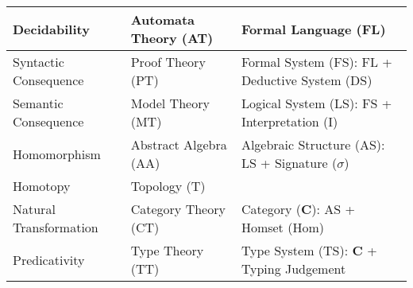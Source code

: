 \begin{tabularx}{\textwidth}{| X | X | X |}
    \hline
    Decidability            & Automata Theory (AT)  & Formal Language (FL) \\
    \hline
    Syntactic Consequence   & Proof Theory (PT)     & Formal System (FS): FL + Deductive System (DS) \\
    \hline
    Semantic Consequence    & Model Theory (MT)     & Logical System (LS): FS + Interpretation (I) \\
    \hline
    Homomorphism            & Abstract Algebra (AA) & Algebraic Structure (AS): LS + Signature ($\sigma$) \\
    \hline
    Homotopy                & Topology (T)          & \\
    \hline
    Natural Transformation  & Category Theory (CT)  & Category ($\mathbf{C}$): AS + Homset (Hom) \\
    \hline
    Predicativity           & Type Theory (TT)      & Type System (TS): $\mathbf{C}$ + Typing Judgement\\
    \hline
\end{tabularx}
